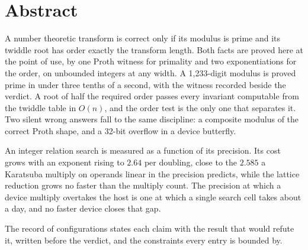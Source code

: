 \chapter*{Abstract}

A number theoretic transform is correct only if its modulus is prime and its twiddle root has order
exactly the transform length. Both facts are proved here at the point of use, by one Proth witness
for primality and two exponentiations for the order, on unbounded integers at any width. A
1{,}233-digit modulus is proved prime in under three tenths of a second, with the witness recorded
beside the verdict. A root of half the required order passes every invariant computable from the
twiddle table in \(O(n)\), and the order test is the only one that separates it. Two silent wrong
answers fall to the same discipline: a composite modulus of the correct Proth shape, and a 32-bit
overflow in a device butterfly.

An integer relation search is measured as a function of its precision. Its cost grows with an
exponent rising to \(2.64\) per doubling, close to the \(2.585\) a Karatsuba multiply on operands
linear in the precision predicts, while the lattice reduction grows no faster than the multiply
count. The precision at which a device multiply overtakes the host is one at which a single search
cell takes about a day, and no faster device closes that gap.

The record of configurations states each claim with the result that would refute it, written before
the verdict, and the constraints every entry is bounded by.
\cleardoublepage

